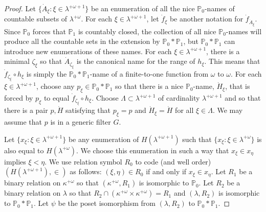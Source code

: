 \documentclass{amsart}
\theoremstyle{plain}
\theoremstyle{definition}
\theoremstyle{remark}
\theoremstyle{plain}
\theoremstyle{definition}
\theoremstyle{remark}
\begin{document}
\begin{proof}
            Let $\{ \dot A_\xi : \xi \in \lambda^{+\omega+1}\}$ be an enumeration
            of all the  nice $\mathbb P_0$-names of countable
            subsets of $\lambda^{+\omega}$. For each $\xi\in \lambda^{+\omega+1}$,
             let $\dot f_\xi$ be another notation for $\dot f_{\dot A_\xi}$.
            Since $\mathbb P_0$ forces that $\mathbb P_1$ is countably closed,
            the collection of all nice  $\mathbb P_0$-names will produce all
            the countable sets in the extension by $\mathbb P_0* \mathbb
            P_1$, but $\mathbb P_0*\mathbb P_1$ can introduce new enumerations of
            these names.
            For each $\xi\in \lambda^{+\omega+1}$,
            there is a minimal $\zeta_\xi$ so that $\dot A_{\zeta_\xi}$ is the
            canonical name for the range of $h_\xi$. This means that
             $\dot f_{\zeta_\xi} \circ h_\xi$ is simply the
             $\mathbb P_0 *\mathbb P_1$-name of a finite-to-one function from
             $\omega$ to $\omega$.
              For each $\xi\in \lambda^{+\omega+1}$,
             choose any $p_\xi \in \mathbb P_0*\mathbb P_1$ so that
             there is a nice $\mathbb P_0$-name, $\dot H_\xi$,
             that is forced by
             $p_\xi$  to equal $\dot f_{\zeta_\xi}\circ h_\xi$.
              Choose $\Lambda\subset \lambda^{+\omega+1}$
              of cardinality $\lambda^{+\omega+1}$
              and so that there is a pair $p,\dot H$
              satisfying that $p_\xi = p$ and $\dot H_\xi = \dot H$
              for all $\xi\in \Lambda$. We may assume that $p$
              is in a generic filter $  G$.


            Let $\{ x_\xi : \xi\in \lambda^{+\omega+1}\}$ be any enumeration of
             $H(\lambda^{+\omega+1})$  such that
             $\{ x_\xi : \xi\in \lambda^{+\omega}\}$ is also equal to
             $H(\lambda^{+\omega})$. We choose this enumeration in such a way that
             $x_\xi\in x_\eta$ implies $\xi<\eta$.
            We use relation symbol $R_0$ to code
            (and well order)
             $(H(\lambda^{+\omega+1}), \in)$ as follows: $(\xi,\eta)\in R_0$
            if and only if $x_\xi\in x_\eta$.
            Let $R_1$ be a binary relation on $\kappa^{+\omega}$ so that
            $(\kappa^{+\omega},R_1)$ is isomorphic to $\mathbb P_0$. Let
             $R_2$ be a binary relation on $\lambda$ so that
             $R_2\cap (\kappa^{+\omega}\times \kappa^{+\omega})=R_1$ and
             $(\lambda,R_2)$ is isomorphic to $\mathbb P_0*\mathbb P_1$.
            Let $\psi$ be the poset isomorphism from $(\lambda,R_2)$ to
             $\mathbb P_0*\mathbb P_1$.


\end{proof}
\end{document}

